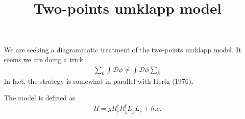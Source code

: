 \documentclass[10pt]{article}
\newcommand{\bea}{\begin{eqnarray}}
\newcommand{\eea}{\end{eqnarray}}
\begin{document}
\title{Two-points umklapp model}
\date{}
\maketitle

We are seeking a diagrammatic treatment of the two-points umklapp model. It seems we are doing a trick
\bea \sum_k\int\mathcal{D}\phi \ne \int\mathcal{D}\phi\sum_k \eea
In fact, the strategy is somewhat in parallel with Hertz (1976). 

The model is defined as
\bea H=gR_\uparrow^\dag R_\downarrow^\dag L_\downarrow L_\uparrow + h.c. \eea
\end{document}
